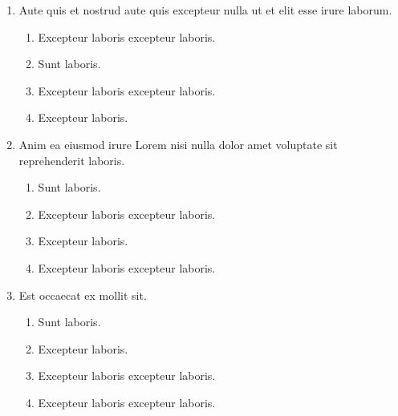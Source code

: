 \documentclass[a4paper,12pt]{article}
\begin{document}
\begin{enumerate}[label=\textbf{\arabic*.}]
\begin{multicols}{2}
\begin{enumerate}
		\item  Excepteur laboris.
    
	\end{enumerate}

\end{multicols}
\item Aute quis et nostrud aute quis excepteur nulla ut et elit esse irure laborum.
\begin{multicols}{2}
	\begin{enumerate}
		\item  Excepteur laboris excepteur laboris.
  
		\item  Sunt laboris.
    
		\item  Excepteur laboris excepteur laboris.
    
		\item  Excepteur laboris.
    
	\end{enumerate}

\end{multicols}
\item Anim ea eiusmod irure Lorem nisi nulla dolor amet voluptate sit reprehenderit laboris.
\begin{multicols}{2}
	\begin{enumerate}
		\item  Sunt laboris.
    
		\item  Excepteur laboris excepteur laboris.
  
		\item  Excepteur laboris.
    
		\item  Excepteur laboris excepteur laboris.
    
	\end{enumerate}

\end{multicols}
\item Est occaecat ex mollit sit.
\begin{multicols}{2}
	\begin{enumerate}
		\item  Sunt laboris.
    
		\item  Excepteur laboris.
    
		\item  Excepteur laboris excepteur laboris.
    
		\item  Excepteur laboris excepteur laboris.
  

\end{enumerate}
\end{multicols}
\end{enumerate}
\end{document}
